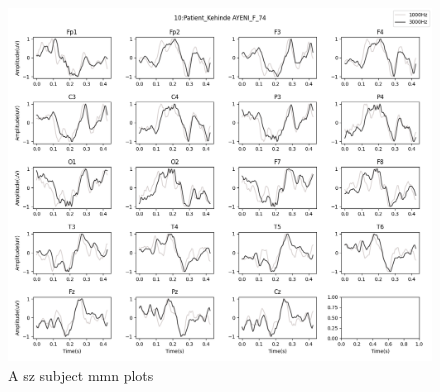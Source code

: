\documentclass[10pt]{article}
\begin{document}
\begin{figure}[H]
  \includegraphics[width=16cm]{../../../data_analysis_results/MMN/time_series/Patient/10.png}
  \caption{A \gls{sz} subject \gls{mmn} plots}
  \label{fig:patientMMN}
\end{figure}



\end{document}
